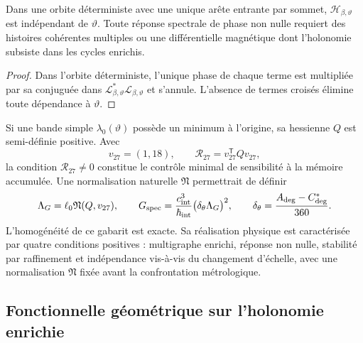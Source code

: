 \begin{proposition}
\label{prop:interferencia-selector-G-rev11}
Dans une orbite déterministe avec une unique arête entrante par sommet,
\(\mathcal H_{\beta,\vartheta}\) est indépendant de \(\vartheta\). Toute
réponse spectrale de phase non nulle requiert des histoires cohérentes
multiples ou une différentielle magnétique dont l'holonomie subsiste dans les cycles
enrichis.
\end{proposition}

\begin{proof}
Dans l'orbite déterministe, l'unique phase de chaque terme est multipliée par sa
conjuguée dans
\(\mathcal L_{\beta,\vartheta}^{*}\mathcal L_{\beta,\vartheta}\)
et s'annule. L'absence de termes croisés élimine toute dépendance à
\(\vartheta\).
\end{proof}

Si une bande simple \(\lambda_0(\vartheta)\) possède un minimum à l'origine,
sa hessienne \(Q\) est semi-définie positive. Avec
\[
 v_{27}=(1,18),
 \qquad
 \mathcal R_{27}=v_{27}^{\mathsf T}Qv_{27},
\]
la condition \(\mathcal R_{27}\neq0\) constitue le contrôle minimal de
sensibilité à la mémoire accumulée. Une normalisation naturelle
\(\mathfrak N\) permettrait de définir
\[
 \Lambda_G=\ell_0\mathfrak N(Q,v_{27}),
 \qquad
 G_{\rm spec}
 =\frac{c_{\rm int}^{3}}{\hbar_{\rm int}}
  \bigl(\delta_\theta\Lambda_G\bigr)^2,
 \qquad
 \delta_\theta=\frac{A_{\rm deg}-C_{\rm deg}^{\ast}}{360}.
\]
L'homogénéité de ce gabarit est exacte. Sa réalisation physique est
caractérisée par quatre conditions positives : multigraphe enrichi,
réponse non nulle, stabilité par raffinement et indépendance vis-à-vis du changement d'échelle,
avec une normalisation \(\mathfrak N\) fixée avant la confrontation
métrologique.

\subsection{Fonctionnelle géométrique sur l'holonomie enrichie}

